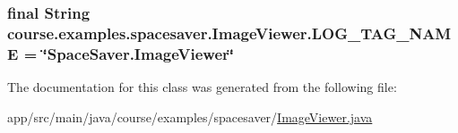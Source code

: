 \subsubsection[{L\+O\+G\+\_\+\+T\+A\+G\+\_\+\+N\+A\+M\+E}]{\setlength{\rightskip}{0pt plus 5cm}final String course.\+examples.\+spacesaver.\+Image\+Viewer.\+L\+O\+G\+\_\+\+T\+A\+G\+\_\+\+N\+A\+M\+E = \char`\"{}Space\+Saver.\+Image\+Viewer\char`\"{}\hspace{0.3cm}{\ttfamily [static]}}\label{classcourse_1_1examples_1_1spacesaver_1_1_image_viewer_af01160015f24efaa8925b71c742633b7}


The documentation for this class was generated from the following file\+:\begin{DoxyCompactItemize}
\item 
app/src/main/java/course/examples/spacesaver/\hyperlink{_image_viewer_8java}{Image\+Viewer.\+java}\end{DoxyCompactItemize}
